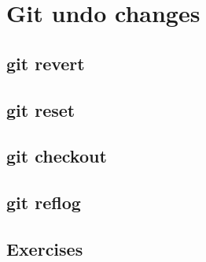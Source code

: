 \section{Git undo changes}
\begin{frame}[fragile]
    \slidetitle
\end{frame}

\subsection{git revert}
\begin{frame}[fragile]
    \subslidetitle
\end{frame}

\subsection{git reset}
\begin{frame}[fragile]
    \subslidetitle
\end{frame}

\subsection{git checkout}
\begin{frame}[fragile]
    \subslidetitle
\end{frame}

\subsection{git reflog}
\begin{frame}[fragile]
    \subslidetitle
\end{frame}

\subsection{Exercises}
\begin{frame}[fragile]
  \subslidetitle
\end{frame}

